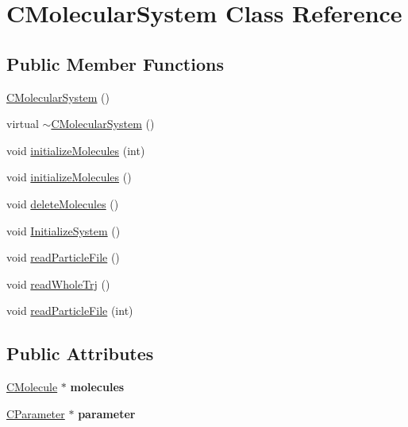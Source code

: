 \hypertarget{classCMolecularSystem}{}\section{C\+Molecular\+System Class Reference}
\label{classCMolecularSystem}
\subsection*{Public Member Functions}
\begin{DoxyCompactItemize}
\item 
\mbox{\hyperlink{classCMolecularSystem_a325446afb524d570b1e2d61123643856}{C\+Molecular\+System}} ()
\item 
virtual \mbox{\hyperlink{classCMolecularSystem_a3d721575a29614a82634fc8798af8512}{$\sim$\+C\+Molecular\+System}} ()
\item 
void \mbox{\hyperlink{classCMolecularSystem_afcebd0d1032cbe262c82825ceb78b4a5}{initialize\+Molecules}} (int)
\item 
void \mbox{\hyperlink{classCMolecularSystem_a3635729781d41229ce16fabea4ce9b6f}{initialize\+Molecules}} ()
\item 
void \mbox{\hyperlink{classCMolecularSystem_a5a31541d610fe40d42a31283eb9a8845}{delete\+Molecules}} ()
\item 
void \mbox{\hyperlink{classCMolecularSystem_a9084e19d4554f70ae7e603c7cab3a2ae}{Initialize\+System}} ()
\item 
void \mbox{\hyperlink{classCMolecularSystem_a019709e83f903659bdb82c226da4189a}{read\+Particle\+File}} ()
\item 
void \mbox{\hyperlink{classCMolecularSystem_a68c2be35fb9f9dbd1915ddf1c845eb15}{read\+Whole\+Trj}} ()
\item 
void \mbox{\hyperlink{classCMolecularSystem_a7ccd08c6a0182faf0316d9f1f8ec1651}{read\+Particle\+File}} (int)
\end{DoxyCompactItemize}
\subsection*{Public Attributes}
\begin{DoxyCompactItemize}
\item 
\mbox{\label{classCMolecularSystem_a1431a8bd6aa95b62a025afdca53d9e1c}} 
\mbox{\hyperlink{classCMolecule}{C\+Molecule}} $\ast$ {\bfseries molecules}
\item 
\mbox{\label{classCMolecularSystem_a4139e417a2b508576800fc44ce691db2}} 
\mbox{\hyperlink{classCParameter}{C\+Parameter}} $\ast$ {\bfseries parameter}
\end{DoxyCompactItemize}


